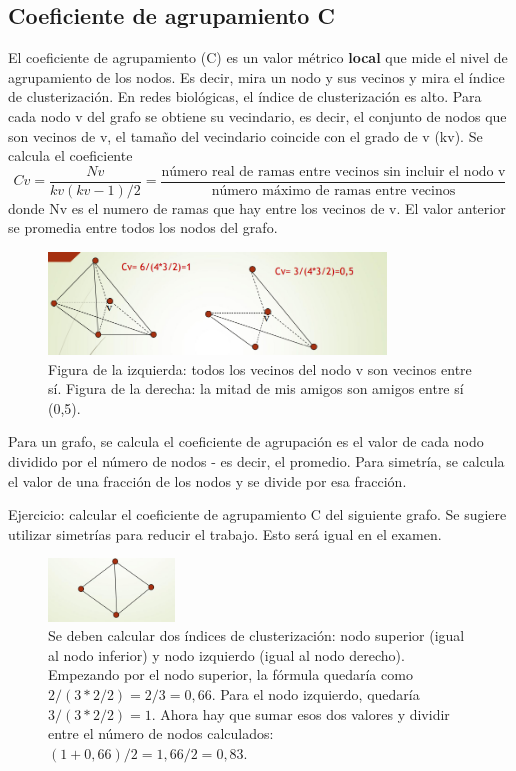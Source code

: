 \subsection{Coeficiente de agrupamiento C}
El coeficiente de agrupamiento (C) es un valor métrico \textbf{local} que mide el nivel de agrupamiento de los nodos. Es decir, mira un nodo y sus vecinos y mira el índice de clusterización. En redes biológicas, el índice de clusterización es alto. Para cada nodo v del grafo se obtiene su vecindario, es decir, el conjunto de nodos que son vecinos de v, el tamaño del vecindario coincide con el grado de v (kv). Se calcula el coeficiente
$$Cv = \frac{Nv}{kv(kv-1)/2} = \frac{\text{número real de ramas entre vecinos sin incluir el nodo v}}{\text{número máximo de ramas entre vecinos}}$$
donde Nv es el numero de ramas que hay entre los vecinos de v. El valor anterior se promedia entre todos los nodos del grafo. 

\begin{figure}[h]
\centering
\includegraphics[width = 0.8\textwidth]{figs/coeficiente-agrupamiento.png}
\caption{Figura de la izquierda: todos los vecinos del nodo v son vecinos entre sí. Figura de la derecha: la mitad de mis amigos son amigos entre sí (0,5).}
\end{figure}

Para un grafo, se calcula el coeficiente de agrupación es el valor de cada nodo dividido por el número de nodos - es decir, el promedio. Para simetría, se calcula el valor de una fracción de los nodos y se divide por esa fracción.

Ejercicio: calcular el coeficiente de agrupamiento C del siguiente grafo. Se sugiere utilizar simetrías para reducir el trabajo. Esto será igual en el examen. 

\begin{figure}[h]
\centering
\includegraphics[width = 0.3\textwidth]{figs/ejercicio-calculo-c.png}
\caption{Se deben calcular dos índices de clusterización: nodo superior (igual al nodo inferior) y nodo izquierdo (igual al nodo derecho). Empezando por el nodo superior, la fórmula quedaría como $2/(3*2/2) = 2/3 = 0,66$. Para el nodo izquierdo, quedaría $3/(3*2/2) = 1$. Ahora hay que sumar esos dos valores y dividir entre el número de nodos calculados: $(1 + 0,66)/ 2 = 1,66/2 = 0,83$.}
\end{figure}


